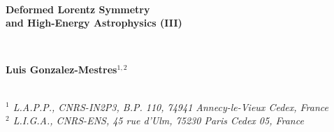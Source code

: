 \documentclass[a4paper,12pt,dvips]{article}
\begin{document}
%
\makeatletter{}
\makeatother\thispagestyle{icrc}
%
%

\begin{center}
%
~ 

{\LARGE \bf Deformed Lorentz Symmetry\\ 
and High-Energy Astrophysics (III)}
\end{center}

\begin{center}
%
%
~ 

{\bf Luis Gonzalez-Mestres$^{1,2}$}\\

~ 

{\it $^{1}$ L.A.P.P., CNRS-IN2P3, B.P. 110, 74941 Annecy-le-Vieux Cedex, France \\
$^{2}$ L.I.G.A., CNRS-ENS, 45 rue d'Ulm, 75230 Paris Cedex 05, France }
\end{center}

~ 
\end{document}
